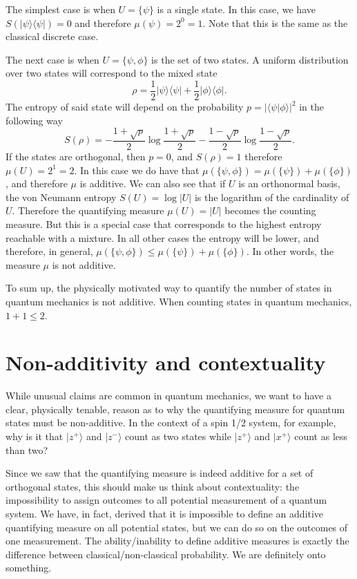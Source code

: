 \documentclass[10pt,twocolumn, nofootinbib]{revtex4-2}
\def\>{\rangle}
\def\<{\langle}
\begin{document}
The simplest case is when $U = \{ \psi \}$ is a single state. In this case, we have $S(|\psi\>\<\psi|) = 0$ and therefore $\mu({\psi}) = 2^{0} = 1$. Note that this is the same as the classical discrete case.

The next case is when $U = \{ \psi, \phi \}$ is the set of two states. A uniform distribution over two states will correspond to the mixed state
\begin{equation}
	\rho = \frac{1}{2} |\psi\>\<\psi| + \frac{1}{2} |\phi\>\<\phi|.
\end{equation}
The entropy of said state will depend on the probability $p=|\<\psi | \phi \>|^2$ in the following way
\begin{equation}
	S(\rho) = - \frac{1+\sqrt{p}}{2} \log \frac{1+\sqrt{p}}{2} 
	- \frac{1-\sqrt{p}}{2} \log \frac{1-\sqrt{p}}{2}.
\end{equation}
If the states are orthogonal, then $p=0$, and $S(\rho) = 1$ therefore $\mu(U) = 2^1 = 2$. In this case we do have that $\mu(\{ \psi, \phi \}) = \mu(\{\psi\}) + \mu(\{\phi\})$, and therefore $\mu$ is additive. We can also see that if $U$ is an orthonormal basis, the von Neumann entropy $S(U) = \log |U|$ is the logarithm of the cardinality of $U$. Therefore the quantifying measure $\mu(U) = |U|$ becomes the counting measure. But this is a special case that corresponds to the highest entropy reachable with a mixture. In all other cases the entropy will be lower, and therefore, in general, $\mu(\{ \psi, \phi \}) \leq \mu(\{\psi\}) + \mu(\{\phi\})$. In other words, the measure $\mu$ is not additive.

To sum up, the physically motivated way to quantify the number of states in quantum mechanics is not additive. When counting states in quantum mechanics, $1+1 \leq 2$.

\section{Non-additivity and contextuality}

While unusual claims are common in quantum mechanics, we want to have a clear, physically tenable, reason as to why the quantifying measure for quantum states must be non-additive. In the context of a spin 1/2 system, for example, why is it that $|z^+\>$ and $|z^-\>$ count as two states while $|z^+\>$ and $|x^+\>$ count as less than two?

Since we saw that the quantifying measure is indeed additive for a set of orthogonal states, this should make us think about contextuality: the impossibility to assign outcomes to all potential measurement of a quantum system. We have, in fact, derived that it is impossible to define an additive quantifying measure on all potential states, but we can do so on the outcomes of one measurement. The ability/inability to define additive measures is exactly the difference between classical/non-classical probability. We are definitely onto something.
\end{document}
